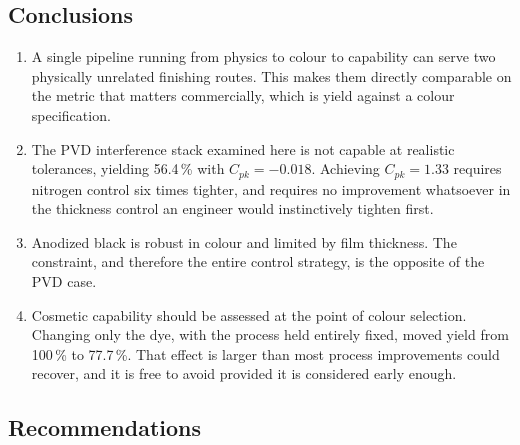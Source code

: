 \documentclass[11pt,a4paper]{article}
\newcommand{\Cpk}{\ensuremath{C_{pk}}}
\begin{document}
\subsection{Conclusions}

\begin{enumerate}[leftmargin=1.6em, itemsep=5pt]

\item A single pipeline running from physics to colour to capability can serve
two physically unrelated finishing routes. This makes them directly comparable
on the metric that matters commercially, which is yield against a colour
specification.

\item The PVD interference stack examined here is not capable at realistic
tolerances, yielding 56.4\,\% with $\Cpk = -0.018$. Achieving $\Cpk = 1.33$
requires nitrogen control six times tighter, and requires no improvement
whatsoever in the thickness control an engineer would instinctively tighten
first.

\item Anodized black is robust in colour and limited by film thickness. The
constraint, and therefore the entire control strategy, is the opposite of the
PVD case.

\item Cosmetic capability should be assessed at the point of colour selection.
Changing only the dye, with the process held entirely fixed, moved yield from
100\,\% to 77.7\,\%. That effect is larger than most process improvements could
recover, and it is free to avoid provided it is considered early enough.

\end{enumerate}

\subsection{Recommendations}
\end{document}
